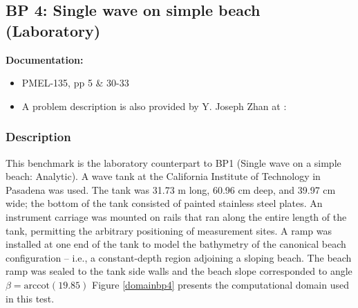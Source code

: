 \newsection

\subsection{BP 4:
 Single wave on simple beach (Laboratory)}


{\bf Documentation:}
\begin {itemize}

\item PMEL-135, pp 5 \& 30-33
\item A problem description is also provided by Y. Joseph Zhan  
 at \cite{bp-description}:\\
\end {itemize}

\subsubsection{Description}
This benchmark is the laboratory counterpart to BP1 (Single wave on a simple beach: Analytic).  A wave tank at the California Institute of Technology in Pasadena was used.  The tank was 31.73 m long, 60.96 cm deep, and 39.97 cm wide; the bottom of the tank consisted of painted stainless
steel plates.  An instrument carriage was mounted on rails that ran along the entire length of the tank, permitting the arbitrary positioning of measurement sites.  A ramp was installed at one end of the tank to model the bathymetry of the canonical beach configuration -- i.e., a constant-depth region adjoining a sloping beach.  The beach ramp was sealed to the tank side walls and the beach slope corresponded to angle $\beta = \text{arccot}(19.85)$  Figure \ref{domainbp4} presents the computational domain used in this test.  

